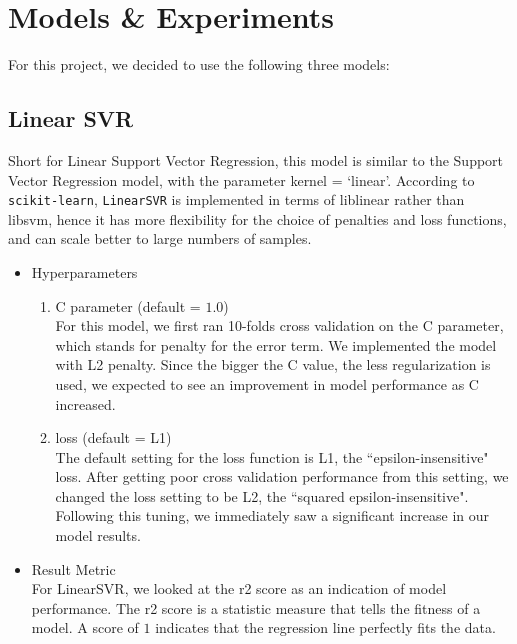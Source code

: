 
\section{Models \& Experiments}
\label{sec:expts}
For this project, we decided to use the following three models:
\subsection{Linear SVR}
  Short for Linear Support Vector Regression, this model is similar to the Support Vector Regression model, with the parameter kernel = `linear'. According to \texttt{scikit-learn}, \texttt{LinearSVR} is implemented in terms of liblinear rather than libsvm, hence it has more flexibility for the choice of penalties and loss functions, and can scale better to large numbers of samples. 
  \begin{itemize}
      \item Hyperparameters
  \begin{enumerate}
    \item C parameter (default = $1.0$)\\
    For this model, we first ran 10-folds cross validation on the C parameter, which stands for penalty for the error term. We implemented the model with L2 penalty. Since the bigger the C value, the less regularization is used, we expected to see an improvement in model performance as C increased.
    \item loss (default = L1)\\
    The default setting for the loss function is L1, the ``epsilon-insensitive" loss. After getting poor cross validation performance from this setting, we changed the loss setting to be L2, the ``squared epsilon-insensitive". Following this tuning, we immediately saw a significant increase in our model results.
    \end{enumerate}
    \item Result Metric\\
    For LinearSVR, we looked at the r2 score as an indication of model performance. The r2 score is a statistic measure that tells the fitness of a model. A score of $1$ indicates that the regression line perfectly fits the data. \\
 \end{itemize}
